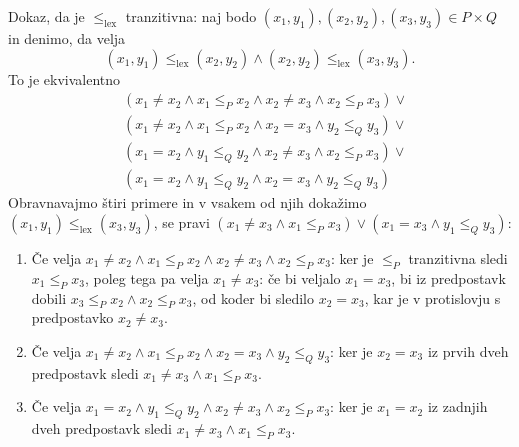 \begin{dokaz}
  Dokaz, da je $\leq_\mathrm{lex}$ tranzitivna: naj bodo $(x_1,y_1), (x_2,y_2), (x_3, y_3) \in P \times Q$ in denimo, da velja
  \begin{equation*}
    (x_1, y_1) \leq_\mathrm{lex} (x_2, y_2) \land (x_2, y_2) \leq_\mathrm{lex} (x_3, y_3).
  \end{equation*}
  To je ekvivalentno
  \begin{align*}
  & (x_1 \neq x_2 \land x_1 \leq_P x_2 \land x_2 \neq x_3 \land x_2 \leq_P x_3) \lor  {} \\
  & (x_1 \neq x_2 \land x_1 \leq_P x_2 \land x_2 = x_3 \land y_2 \leq_Q y_3) \lor {} \\
  & (x_1 = x_2 \land y_1 \leq_Q y_2 \land x_2 \neq x_3 \land x_2 \leq_P x_3) \lor {} \\
  & (x_1 = x_2 \land y_1 \leq_Q y_2 \land x_2 = x_3 \land y_2 \leq_Q y_3)
  \end{align*}
  Obravnavajmo štiri primere in v vsakem od njih dokažimo $(x_1, y_1) \leq_\mathrm{lex} (x_3, y_3)$, se pravi
  $(x_1 \neq x_3 \land x_1 \leq_P x_3) \lor (x_1 = x_3 \land y_1 \leq_Q y_3)$:
  \begin{enumerate}
  \item Če velja $x_1 \neq x_2 \land x_1 \leq_P x_2 \land x_2 \neq x_3 \land x_2 \leq_P x_3$: ker je $\leq_P$ tranzitivna sledi $x_1 \leq_P x_3$, poleg tega pa velja $x_1 \neq
    x_3$: če bi veljalo $x_1 = x_3$, bi iz predpostavk dobili $x_3 \leq_P x_2 \land x_2 \leq_P x_3$, od koder bi sledilo $x_2 = x_3$, kar je v
    protislovju s predpostavko $x_2 \neq x_3$.

  \item Če velja $x_1 \neq x_2 \land x_1 \leq_P x_2 \land x_2 = x_3 \land y_2 \leq_Q y_3$: ker je $x_2 = x_3$ iz prvih dveh predpostavk sledi $x_1 \neq x_3 \land x_1 \leq_P x_3$.

  \item Če velja $x_1 = x_2 \land y_1 \leq_Q y_2 \land x_2 \neq x_3 \land x_2 \leq_P x_3$: ker je $x_1 = x_2$ iz zadnjih dveh predpostavk sledi $x_1 \neq x_3 \land x_1 \leq_P x_3$.


\end{enumerate}
\end{dokaz}

